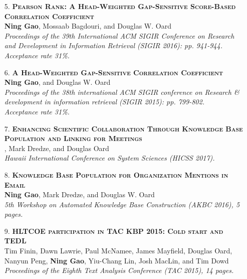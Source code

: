 \documentclass[a4paper, 11pt]{article}
\begin{document}
\begin{itemize}
\item[\color{bl3} 5.]{\scshape\color{bl3}\bf Pearson Rank: A Head-Weighted Gap-Sensitive Score-Based Correlation Coefficient}\\
{\color{black} \textbf{Ning Gao}, Mossaab Bagdouri, and Douglas W. Oard \\
\emph{Proceedings of the 39th International ACM SIGIR Conference on Research and Development in Information Retrieval (SIGIR 2016): pp. 941-944.\\ Acceptance rate 31\%.}}
\vspace{2mm}



\item[\color{bl3} 6.]{\scshape\color{bl3}\bf A Head-Weighted Gap-Sensitive Correlation Coefficient}\\
{\color{black} \textbf{Ning Gao}, and Douglas W. Oard} \\
\emph{Proceedings of the 38th international ACM SIGIR conference on Research \& development in information retrieval (SIGIR 2015): pp. 799-802.\\ Acceptance rate 31\%.}
\vspace{2mm}

\item[\color{bl3} 7.]{\scshape\color{bl3}\bf Enhancing Scientific Collaboration Through Knowledge Base Population and Linking for Meetings}\\
, Mark Dredze, and Douglas Oard\\
\emph{Hawaii International Conference on System Sciences (HICSS 2017).}
\vspace{2mm}

\item[\color{bl3} 8.]{\scshape\color{bl3}\bf Knowledge Base Population for Organization Mentions in Email}\\
{\color{black} \textbf{Ning Gao}, Mark Dredze, and Douglas W. Oard \\
\emph{5th Workshop on Automated Knowledge Base Construction (AKBC 2016), 5 pages.}}
\vspace{2mm}

\item[\color{bl3} 9.]{\scshape\color{bl3}\bf HLTCOE participation in TAC KBP 2015: Cold start and TEDL}\\
{\color{black}Tim Finin, Dawn Lawrie, Paul McNamee, James Mayfield, Douglas Oard, Nanyun Peng, \textbf{Ning Gao}, Yiu-Chang Lin, Josh MacLin, and Tim Dowd \\
\emph{Proceedings of the Eighth Text Analysis Conference (TAC 2015), 14 pages.}}
\vspace{2mm}





\end{itemize}
\end{document}
